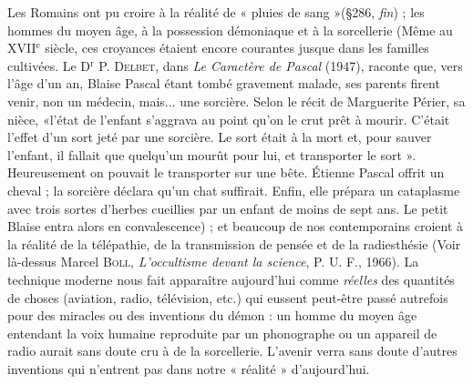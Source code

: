 Les Romains ont pu croire à la réalité de « pluies de sang »(\S 286,
{\it fin}) ; les hommes du moyen âge, à la possession démoniaque et à la
sorcellerie
{\scriptsize (Même au {\tiny XVII}$^\text{e}$ siècle, ces croyances étaient encore courantes jusque dans les
familles cultivées. Le D$^\text{r}$ P. \textsc{Delbet}, dans {\it Le Caractère de Pascal} (1947), raconte que,
vers l’âge d’un an, Blaise Pascal étant tombé gravement malade, ses parents firent
venir, non un médecin, mais... une sorcière. Selon le récit de Marguerite Périer, sa nièce,
«l’état de l'enfant s’aggrava au point qu’on le crut prêt à mourir. C'était l'effet d’un
sort jeté par une sorcière. Le sort était à la mort et, pour sauver l'enfant, il fallait que
quelqu'un mourût pour lui, et transporter le sort ». Heureusement on pouvait le transporter
sur une bête. Étienne Pascal offrit un cheval ; la sorcière déclara qu'un chat
suffirait. Enfin, elle prépara un cataplasme avec trois sortes d'herbes cueillies par un
enfant de moins de sept ans. Le petit Blaise entra alors en convalescence)}
; et beaucoup de nos contemporains croient à la réalité
de la télépathie, de la transmission de pensée et de la radiesthésie
{\scriptsize (Voir là-dessus Marcel \textsc{Boll}, {\it L'occultisme devant la science}, P. U. F., 1966)}.
La technique moderne nous fait apparaître aujourd’hui comme
{\it réelles} des quantités de choses (aviation, radio, télévision, etc.) qui
eussent peut-être passé autrefois pour des miracles ou des inventions
du démon : un homme du moyen âge entendant la voix humaine
reproduite par un phonographe ou un appareil de radio aurait sans
doute cru à de la sorcellerie. L'avenir verra sans doute d’autres inventions
qui n’entrent pas dans notre « réalité » d’aujourd’hui.

